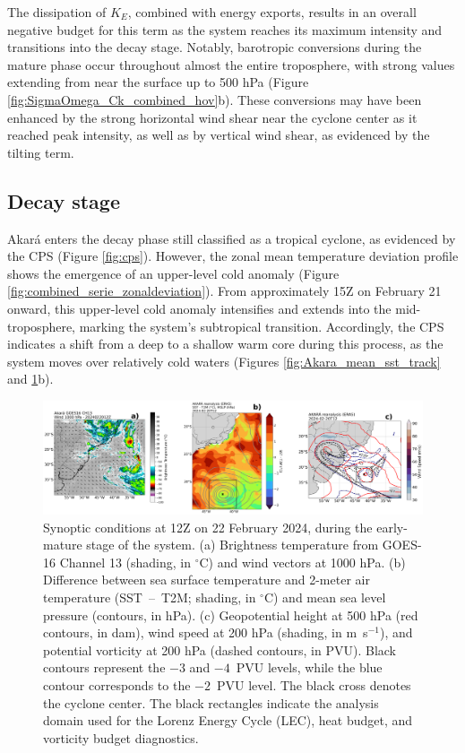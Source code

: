 \documentclass[pdflatex,sn-chicago]{sn-jnl}%
\theoremstyle{plain}
\theoremstyle{definition}
\theoremstyle{remark}
\theoremstyle{definition}
\begin{document}
The dissipation of $K_E$, combined with energy exports, results in an overall negative budget for this term as the system reaches its maximum intensity and transitions into the decay stage. Notably, barotropic conversions during the mature phase occur throughout almost the entire troposphere, with strong values extending from near the surface up to 500 hPa (Figure \ref{fig:SigmaOmega_Ck_combined_hov}b). These conversions may have been enhanced by the strong horizontal wind shear near the cyclone center as it reached peak intensity, as well as by vertical wind shear, as evidenced by the tilting term.

\subsection{Decay stage}

Akará enters the decay phase still classified as a tropical cyclone, as evidenced by the CPS (Figure \ref{fig:cps}). However, the zonal mean temperature deviation profile shows the emergence of an upper-level cold anomaly (Figure \ref{fig:combined_serie_zonaldeviation}). From approximately 15Z on February 21 onward, this upper-level cold anomaly intensifies and extends into the mid-troposphere, marking the system's subtropical transition. Accordingly, the CPS indicates a shift from a deep to a shallow warm core during this process, as the system moves over relatively cold waters (Figures \ref{fig:Akara_mean_sst_track} and \ref{fig:composition_06}b).

\begin{figure}[h!]
\centering
\includegraphics[width=\textwidth]{composition_06.png}
\caption{Synoptic conditions at 12Z on 22 February 2024, during the early-mature stage of the system. (a) Brightness temperature from GOES-16 Channel 13 (shading, in $^{\circ}$C) and wind vectors at 1000 hPa. (b) Difference between sea surface temperature and 2-meter air temperature (SST~--~T2M; shading, in $^{\circ}$C) and mean sea level pressure (contours, in hPa). (c) Geopotential height at 500 hPa (red contours, in dam), wind speed at 200 hPa (shading, in m~s$^{-1}$), and potential vorticity at 200 hPa (dashed contours, in PVU). Black contours represent the $-3$ and $-4$~PVU levels, while the blue contour corresponds to the $-2$~PVU level. The black cross denotes the cyclone center. The black rectangles indicate the analysis domain used for the Lorenz Energy Cycle (LEC), heat budget, and vorticity budget diagnostics.}
\label{fig:composition_06}
\end{figure}
\end{document}
